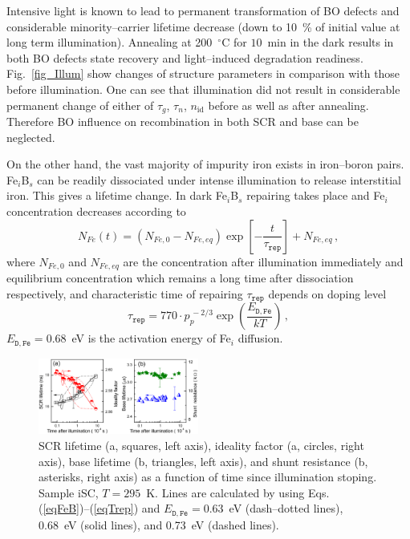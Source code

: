 \documentclass[aip,jap, amsmath,amssymb,reprint]{revtex4-1}
\begin{document}
Intensive light is known\cite{LIDRev,LIDRev2} to lead to permanent transformation of BO defects and considerable minority--carrier lifetime decrease (down to 10~\% of initial value at long term illumination).
Annealing at 200~$^\circ$C for $10$~min in the dark results in both BO defects state recovery and light--induced degradation readiness.
Fig.~\ref{fig_Illum} show changes of structure parameters in comparison with those before illumination.
One can see that illumination did not result in considerable permanent change of either of $\tau_g$, $\tau_n$, $n_{\mathrm{id}}$ before as well as after annealing.
Therefore BO influence on recombination in both SCR and base can be neglected.

On the other hand, the vast majority of impurity iron exists in iron--boron pairs.
Fe$_i$B$_s$ can be readily dissociated under intense illumination to release interstitial iron.
This gives a lifetime change.
In dark Fe$_i$B$_s$ repairing takes place and Fe$_i$ concentration decreases according to \cite{MurphyJAP2011,Wijaranakula}
\begin{equation}
\label{eqFeB}
N_{Fe}(t)=(N_{Fe,0}-N_{Fe,eq})\exp\left[-\frac{t}{\tau_{\mathtt{rep}}}\right]+N_{Fe,eq}\,,
\end{equation}
where
$N_{Fe,0}$ and $N_{Fe,eq}$ are the concentration after illumination immediately and equilibrium
concentration which remains a long time after dissociation respectively,
and characteristic time of repairing $\tau_{\mathtt{rep}}$ depends on doping level
\begin{equation}
\label{eqTrep}
\tau_{\mathtt{rep}}=770\cdot p_p^{\,-2/3}\exp\left(\frac{E_{\mathtt{D,Fe}}}{kT}\right)\,,
\end{equation}
$E_{\mathtt{D,Fe}}=0.68$~eV is the activation energy of Fe$_i$ diffusion.

\begin{figure}
\includegraphics[width=0.47\textwidth]{fig_11ab}%
\caption{\label{fig_Time}
SCR lifetime (a, squares, left axis), ideality factor (a, circles, right axis), base  lifetime (b, triangles, left axis), and shunt resistance (b, asterisks, right axis) as a function of time since illumination stoping.
Sample iSC, $T=295$~K.
Lines are calculated by using Eqs.(\ref{eqFeB})--(\ref{eqTrep}) and $E_{\mathtt{D,Fe}}=0.63$~eV (dash--dotted lines), 0.68~eV (solid lines), and 0.73~eV (dashed lines).
}%
\end{figure}
\end{document}
